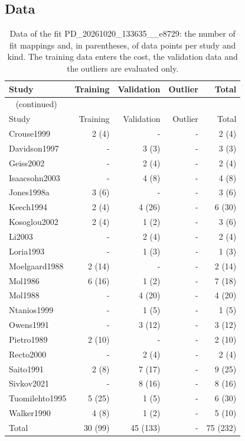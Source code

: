 \documentclass{article}
\begin{document}
\subsection{Data}

\begin{longtable}{lrrrr}
\caption{Data of the fit PD\_20261020\_133635\_\_e8729: the number of fit mappings and, in parentheses, of data points per study and kind. The training data enters the cost, the validation data and the outliers are evaluated only.}\label{tab:data:PD_20261020_133635__e8729} \\
\toprule
Study & Training & Validation & Outlier & Total \\
\midrule
\endfirsthead
\multicolumn{5}{l}{\small\tablename~\thetable{} (continued)} \\
\toprule
Study & Training & Validation & Outlier & Total \\
\midrule
\endhead
\bottomrule
\endlastfoot
Crouse1999 & 2 (4) & - & - & 2 (4) \\
Davidson1997 & - & 3 (3) & - & 3 (3) \\
Geiss2002 & - & 2 (4) & - & 2 (4) \\
Isaacsohn2003 & - & 4 (8) & - & 4 (8) \\
Jones1998a & 3 (6) & - & - & 3 (6) \\
Keech1994 & 2 (4) & 4 (26) & - & 6 (30) \\
Kosoglou2002 & 2 (4) & 1 (2) & - & 3 (6) \\
Li2003 & - & 2 (4) & - & 2 (4) \\
Loria1993 & - & 1 (3) & - & 1 (3) \\
Moelgaard1988 & 2 (14) & - & - & 2 (14) \\
Mol1986 & 6 (16) & 1 (2) & - & 7 (18) \\
Mol1988 & - & 4 (20) & - & 4 (20) \\
Ntanios1999 & - & 1 (5) & - & 1 (5) \\
Owens1991 & - & 3 (12) & - & 3 (12) \\
Pietro1989 & 2 (10) & - & - & 2 (10) \\
Recto2000 & - & 2 (4) & - & 2 (4) \\
Saito1991 & 2 (8) & 7 (17) & - & 9 (25) \\
Sivkov2021 & - & 8 (16) & - & 8 (16) \\
Tuomilehto1995 & 5 (25) & 1 (5) & - & 6 (30) \\
Walker1990 & 4 (8) & 1 (2) & - & 5 (10) \\
Total & 30 (99) & 45 (133) & - & 75 (232) \\
\end{longtable}
\end{document}
